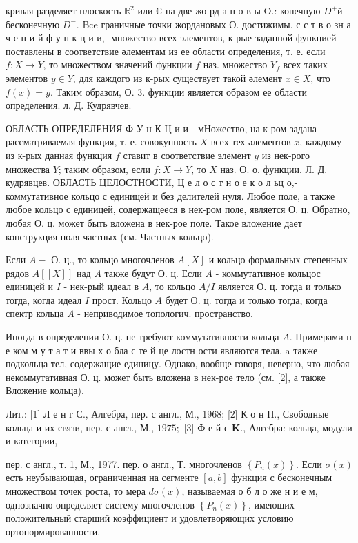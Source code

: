 \documentclass[10pt]{article}
\begin{document}
кривая разделяет плоскость $\mathbb{R}^{2}$ или $\mathbb{C}$ на две жо рд а н о в ы O.: конечную $D^{+}$й бесконечную $D^{-}$. Bce граничные точки жордановых О. достижимы. с с т в о зн а ч е н и й ф у н к ц и и,- множество всех элементов, к-рые заданной функцией поставлены в соответствие әлементам из ее области определения, т. е. если $f: X \rightarrow Y$, то множеством значений функции $f$ наз. множество $Y_{f}$ всех таких элементов $y \in Y$, для каждого из к-рых существует такой әлемент $x \in X$, что $f(x)=y$. Таким образом, О. 3. функции является образом ее области определения. л. Д. Кудрявчев.



ОБЛАСТЬ ОПРЕДЕЛЕНИЯ Ф У н К Ц и и - мНожество, на к-ром задана рассматриваемая функция, т. е. совокупность $X$ всех тех әлементов $x$, каждому из к-рых данная функция $f$ ставит в соответствие элемент $y$ из нек-рого множества $Y$; таким образом, если $f: X \rightarrow Y$, то $X$ наз. О. о. функции. Л. Д. кудрявцев. ОБЛАСТЬ ЦЕЛОСТНОСТИ, Ц е л о с т н о е к о л ьц о,- коммутативное кольцо с единицей и без делителей нуля. Любое поле, а также любое кольцо с единицей, содержащееся в нек-ром поле, является О. ц. Обратно, любая О. ц. может быть вложена в нек-рое поле. Такое вложение дает конструкция поля частных (см. Частных кольцо).



Если $A-$ О. ц., то кольцо многочленов $A[X]$ и кольцо формальных степенных рядов $A[[X]]$ над $A$ также будут О. ц. Если $A$ - коммутативное кольцос единицей и $I$ - нек-рый идеал в $A$, то кольцо $A / I$ является О. ц. тогда и только тогда, когда идеал $I$ прост. Кольцо $A$ будет О. ц. тогда и только тогда, когда спектр кольца $A$ - неприводимое топологич. пространство.



Иногда в определении $О$. ц. не требуют коммутативности кольца $A$. Примерами н е ком м у т а т и ввы х о бла с те й це лостн ости являются тела, a также подкольца тел, содержащие единицу. Однако, вообще говоря, неверно, что любая некоммутативная О. ц. может быть вложена в нек-рое тело (см. [2], а также Вложение кольца).



Лит.: [1] Л е н г С., Алгебра, пер. с англ., М., 1968; [2] К о н П., Свободные кольца и их связи, пер. с англ., М., $1975 ;$ [3] Ф е й с $\mathbf{K} .$, Алгебра: кольца, модули и категории,

пер. с англ., т. 1, М., 1977. пер. о англ., Т. многочленов $\left\{P_{n}(x)\right\}$. Если $\sigma(x)$ есть неубывающая, ограниченная на сегменте $[a, b]$ функция с бесконечным множеством точек роста, то мера $d \sigma(x)$, называемая о б л о же н и е м, однозначно определяет систему многочленов $\left\{P_{n}(x)\right\}$, имеющих положительный старший коэффициент и удовлетворяющих условию ортонормированности.
\end{document}

